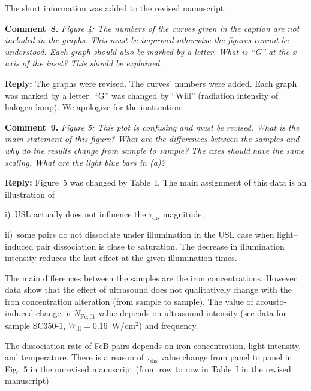 \documentclass[sn-mathphys]{sn-jnl}
\begin{document}
The short information was added to the revised manuscript.

\vspace{1cm}
\noindent
\textcolor[rgb]{0.00,0.50,1.00}{\textbf{Comment~8.}}
\emph{Figure 4: The numbers of the curves given in the caption are not included in the graphs. This must be improved otherwise the figures cannot be understood. Each graph should also be marked by a letter. What is ``G'' at the x-axis of the inset? This should be explained. }


\noindent
\textcolor[rgb]{0.51,0.00,0.00}{\textbf{Reply:}}
The graphs were revised.
The curves' numbers were added.
Each graph was marked by a letter.
``G'' was changed by ``Will'' (radiation intensity of halogen lamp).
We apologize for the inattention.


\vspace{1cm}
\noindent
\textcolor[rgb]{0.00,0.50,1.00}{\textbf{Comment~9.}}
\emph{Figure 5: This plot is confusing and must be revised. What is the main statement of this figure? What are the differences between the samples and why do the results change from sample to sample? The axes should have the same scaling. What are the light blue bars in (a)? }

\noindent
\textcolor[rgb]{0.51,0.00,0.00}{\textbf{Reply:}}
Figure~5 was changed by Table~I.
The main assignment of this data is an illustration of

\noindent
i)~USL actually does not influence the $\tau_\mathrm{dis}$  magnitude;

\noindent
ii)~some pairs do not dissociate under illumination in the USL case when light--induced pair dissociation is close to saturation.
The decrease in illumination intensity reduces the last effect at the given illumination times.

The main differences between the samples are the iron concentrations.
However, data show that
the effect of ultrasound does not qualitatively change with the iron concentration alteration
(from sample to sample).
The value of acousto-induced change in $N_\mathrm{Fe,fit}$ value depends on ultrasound intensity
(see data for sample SC350-1, $W_\mathrm{ill}=0.16$~W/cm$^2$) and frequency.


The dissociation rate of FeB pairs depends on iron concentration, light intensity, and
temperature\cite{Schmidt2019,FeBLight2,FeBKin2019,Lagowskii1993}.
There is a reason of $\tau_\mathrm{dis}$ value change from panel to panel in Fig.~5 in the unrevised manuscript (from row to row in Table~I in the revised manuscript)
\end{document}
